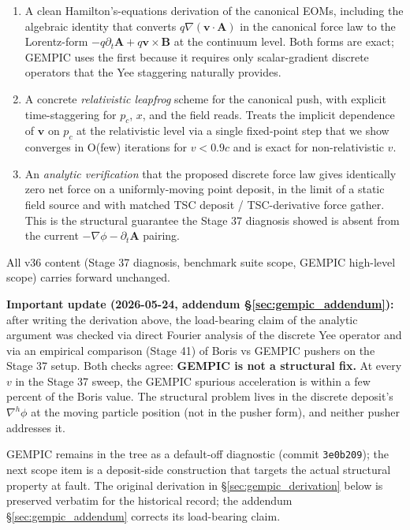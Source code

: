 \documentclass[11pt,a4paper]{article}
\newcommand{\vv}[1]{\mathbf{#1}}
\begin{document}
\begin{enumerate}
  \item A clean Hamilton's-equations derivation of the canonical
    EOMs, including the algebraic identity that converts
    $q\nabla(\vv{v}\cdot\vv{A})$ in the canonical force law to the
    Lorentz-form $-q\partial_t\vv{A} + q\vv{v}\times\vv{B}$ at the
    continuum level.  Both forms are exact; GEMPIC uses the first
    because it requires only scalar-gradient discrete operators
    that the Yee staggering naturally provides.
  \item A concrete \emph{relativistic leapfrog} scheme for the
    canonical push, with explicit time-staggering for $p_c$, $x$,
    and the field reads.  Treats the implicit dependence of
    $\vv{v}$ on $p_c$ at the relativistic level via a single
    fixed-point step that we show converges in O(few) iterations
    for $v < 0.9c$ and is exact for non-relativistic $v$.
  \item An \emph{analytic verification} that the proposed discrete
    force law gives identically zero net force on a uniformly-moving
    point deposit, in the limit of a static field source and with
    matched TSC deposit / TSC-derivative force gather.  This is the
    structural guarantee the Stage 37 diagnosis showed is absent
    from the current $-\nabla\phi - \partial_t\vv{A}$ pairing.
\end{enumerate}

All v36 content (Stage 37 diagnosis, benchmark suite scope, GEMPIC
high-level scope) carries forward unchanged.

\textbf{Important update (2026-05-24, addendum
§\ref{sec:gempic_addendum}):} after writing the derivation above,
the load-bearing claim of the analytic argument was checked via
direct Fourier analysis of the discrete Yee operator and via an
empirical comparison (Stage 41) of Boris vs GEMPIC pushers on the
Stage 37 setup.  Both checks agree: \textbf{GEMPIC is not a
structural fix.}  At every $v$ in the Stage 37 sweep, the GEMPIC
spurious acceleration is within a few percent of the Boris value.
The structural problem lives in the discrete deposit's $\nabla^h\phi$
at the moving particle position (not in the pusher form), and
neither pusher addresses it.

GEMPIC remains in the tree as a default-off diagnostic (commit
\texttt{3e0b209}); the next scope item is a deposit-side
construction that targets the actual structural property at fault.
The original derivation in §\ref{sec:gempic_derivation} below is
preserved verbatim for the historical record; the addendum
§\ref{sec:gempic_addendum} corrects its load-bearing claim.
\end{document}
